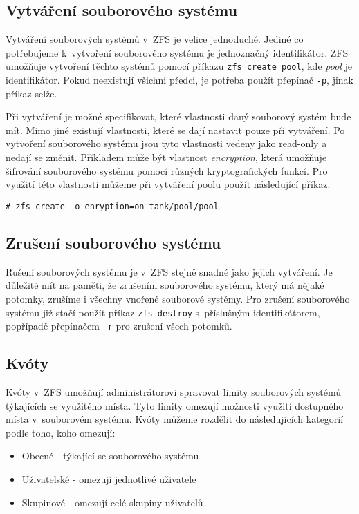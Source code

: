 \subsection{Vytváření souborového systému}
\label{createfs}
Vytváření souborových systémů v~ZFS je velice jednoduché. Jediné co potřebujeme k~vytvoření souborového systému je jednoznačný identifikátor. ZFS umožňuje vytvoření těchto systémů pomocí příkazu \verb|zfs create pool|, kde \emph{pool} je identifikátor. Pokud neexistují všichni předci, je potřeba použít přepínač \verb|-p|, jinak příkaz selže.

Při vytváření je možné specifikovat, které vlastnosti daný souborový systém bude mít. Mimo jiné existují vlastnosti, které se dají nastavit pouze při vytváření. Po vytvoření souborového systému jsou tyto vlastnosti vedeny jako read-only a nedají se změnit. Příkladem může být vlastnost \emph{encryption}, která umožňuje šifrování souborového systému pomocí různých kryptografických funkcí. Pro využití této vlastnosti můžeme při vytváření poolu použít následující příkaz.
\begin{verbatim}
# zfs create -o enryption=on tank/pool/pool
\end{verbatim}
\subsection{Zrušení souborového systému}
Rušení souborových systému je v~ZFS stejně snadné jako jejich vytváření. Je důležité mít na paměti, že zrušením souborového systému, který má nějaké potomky, zrušíme i všechny vnořené souborové systémy. Pro zrušení souborového systému již stačí použít příkaz \verb|zfs destroy| s~příslušným identifikátorem, popřípadě přepínačem \verb|-r| pro zrušení všech potomků.
\subsection{Kvóty}
\label{quota}

Kvóty v~ZFS umožňují administrátorovi spravovat limity souborových systémů týkajících se využitého místa. Tyto limity omezují možnosti využití dostupného místa v~souborovém systému. Kvóty můžeme rozdělit do následujících kategorií podle toho, koho omezují:
\begin{itemize}
  \item Obecné - týkající se souborového systému
  \item Uživatelské - omezují jednotlivé uživatele
  \item Skupinové - omezují celé skupiny uživatelů
\end{itemize}

